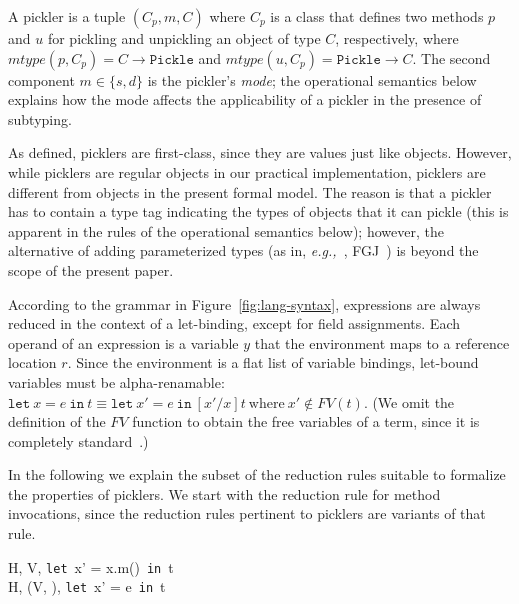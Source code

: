 \documentclass[preprint,10pt]{sigplanconf}
\theoremstyle{definition}
\theoremstyle{definition}
\newcommand{\eg}{{\em e.g.,~}}
\newcommand{\seq}[1]{\overline{#1}}
\newcommand{\sreducebreak}[6]{#1, #2, #3 \\ \;\longrightarrow\; #4, #5, #6}
\begin{document}
A pickler is a tuple $(C_p, m, C)$ where $C_p$ is a class that defines two
methods $p$ and $u$ for pickling and unpickling an object of type $C$,
respectively, where $mtype(p, C_p) = C \rightarrow \texttt{Pickle}$ and
$mtype(u, C_p) = \texttt{Pickle} \rightarrow C$.
The second component $m \in \{s, d\}$ is the pickler's {\em
mode}; the operational semantics below explains how the mode affects the
applicability of a pickler in the presence of subtyping.

As defined, picklers are first-class, since they are values just like objects.
However, while picklers are regular objects in our practical implementation,
picklers are different from objects in the present formal model. The reason is
that a pickler has to contain a type tag indicating the types of objects that
it can pickle (this is apparent in the rules of the operational semantics
below); however, the alternative of adding parameterized types (as in, \eg,
FGJ~\cite{Igarashi2001}) is beyond the scope of the present paper.

According to the grammar in Figure~\ref{fig:lang-syntax}, expressions are
always reduced in the context of a let-binding, except for ﬁeld assignments.
Each operand of an expression is a variable $y$ that the environment maps to a
reference location $r$. Since the environment is a ﬂat list of variable
bindings, let-bound variables must be alpha-renamable:
$\texttt{let}~x = e~\texttt{in}~t \equiv \texttt{let}~x' =
e~\texttt{in}~[x'/x]t~\text{where}~x' \notin FV(t)$. (We omit the
definition of the $FV$ function to obtain the free variables of a
term, since it is completely standard~\cite{TAPL}.)

In the following we explain the subset of the reduction rules suitable to
formalize the properties of picklers. We start with the reduction rule for
method invocations, since the reduction rules pertinent to picklers are
variants of that rule.

\infrule[\textsc{R-Invoke}]
{  V(x) = r  \andalso  H(r) = C(\_)  \\
   V(\seq{y}) = r_1 \ldots r_n       \\
  mbody(m, C) = (\seq{x}, e)
}
{ \sreducebreak H V
    {\texttt{let}~x' = x.m(\seq{y})~\texttt{in}~t}
    H {(V, \seq{x \mapsto r})}
    {\texttt{let}~x' = e~\texttt{in}~t}
}
\end{document}
